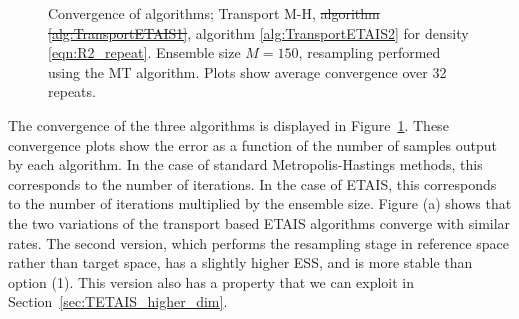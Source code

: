 \documentclass[final]{siamltex}
\newcommand{\edit}[1]{{\color{red} #1}}  %
\providecommand{\DIFadd}[1]{{\protect\color{blue}\uwave{#1}}} %
\providecommand{\DIFdel}[1]{{\protect\color{red}\sout{#1}}}                      %
\providecommand{\DIFaddbegin}{} %
\providecommand{\DIFaddend}{} %
\providecommand{\DIFaddFL}[1]{\DIFadd{#1}} %
\providecommand{\DIFdelFL}[1]{\DIFdel{#1}} %
\providecommand{\DIFaddbeginFL}{} %
\providecommand{\DIFaddendFL}{} %
\providecommand{\DIFdelbeginFL}{} %
\providecommand{\DIFdelendFL}{} %
\newcommand{\DIFscaledelfig}{0.5}
\newlength{\DIFdelgraphicswidth} %
\newlength{\DIFdelgraphicsheight} %
\newcommand{\DIFaddincludegraphics}[2][]{{\color{blue}\fbox{\DIFOincludegraphics[#1]{#2}}}} %
\newcommand{\DIFdelincludegraphics}[2][]{%
\sbox{\DIFdelgraphicsbox}{\DIFOincludegraphics[#1]{#2}}%
\settoboxwidth{\DIFdelgraphicswidth}{\DIFdelgraphicsbox} %
\settoboxtotalheight{\DIFdelgraphicsheight}{\DIFdelgraphicsbox} %
\scalebox{\DIFscaledelfig}{%
\parbox[b]{\DIFdelgraphicswidth}{\usebox{\DIFdelgraphicsbox}\\[-\baselineskip] \rule{\DIFdelgraphicswidth}{0em}}\llap{\resizebox{\DIFdelgraphicswidth}{\DIFdelgraphicsheight}{%
\setlength{\unitlength}{\DIFdelgraphicswidth}%
\begin{picture}(1,1)%
\thicklines\linethickness{2pt} %
{\color[rgb]{1,0,0}\put(0,0){\framebox(1,1){}}}%
{\color[rgb]{1,0,0}\put(0,0){\line( 1,1){1}}}%
{\color[rgb]{1,0,0}\put(0,1){\line(1,-1){1}}}%
\end{picture}%
}\hspace*{3pt}}} %
} %
\DeclareRobustCommand{\DIFaddbegin}{\DIFOaddbegin \let\includegraphics\DIFaddincludegraphics} %
\DeclareRobustCommand{\DIFaddend}{\DIFOaddend \let\includegraphics\DIFOincludegraphics} %
\DeclareRobustCommand{\DIFaddbeginFL}{\DIFOaddbeginFL \let\includegraphics\DIFaddincludegraphics} %
\DeclareRobustCommand{\DIFaddendFL}{\DIFOaddendFL \let\includegraphics\DIFOincludegraphics} %
\DeclareRobustCommand{\DIFdelbeginFL}{\DIFOdelbeginFL \let\includegraphics\DIFdelincludegraphics} %
\DeclareRobustCommand{\DIFdelendFL}{\DIFOaddendFL \let\includegraphics\DIFOincludegraphics} %
\begin{document}
\begin{figure}[!ht]
\centering
{}
\DIFdelbeginFL %
\DIFdelendFL \DIFaddbeginFL {}
\DIFaddendFL \caption{Convergence of algorithms; Transport M-H,
  \DIFdelbeginFL \DIFdelFL{algorithm \ref{alg:TransportETAIS1}}\DIFdelendFL \DIFaddbeginFL \DIFaddFL{Transport ETAIS option 1}\DIFaddendFL , algorithm \ref{alg:TransportETAIS2} for
  density \eqref{eqn:R2_repeat}. Ensemble size $M=150$, resampling
  performed using the MT algorithm. \DIFaddbeginFL \edit{Plots show average
    convergence over 32 repeats.}\DIFaddendFL }
\label{fig:R2_l2_convergence}
\end{figure}

The convergence of the three algorithms is displayed in
Figure~\ref{fig:R2_l2_convergence}. \DIFaddbegin \edit{These convergence plots show
  the error as a function of the number of samples output by each
  algorithm. In the case of standard Metropolis-Hastings methods, this
  corresponds to the number of iterations. In the case of ETAIS, this
  corresponds to the number of iterations multiplied by the ensemble
  size.} \DIFaddend Figure (a) shows that the two
variations of the transport based ETAIS algorithms converge with
similar rates. The second version, which performs the resampling stage
in reference space rather than target space, has a slightly higher
ESS, and is more stable than option (1). This version also has a
property that we can exploit in Section~\ref{sec:TETAIS_higher_dim}.
\end{document}
